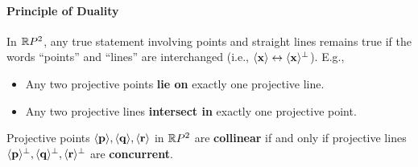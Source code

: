 \paragraph{Principle of Duality}
In \(\mathbb{R} P^2\), any true statement involving points and straight lines remains true if the words ``points'' and ``lines'' are interchanged (i.e., \(\langle \mathbf{x} \rangle \leftrightarrow \langle \mathbf{x} \rangle^\perp\)). E.g.,
\begin{itemize}
    \item Any two projective points \textbf{lie on} exactly one projective line.
    \item Any two projective lines \textbf{intersect in} exactly one projective point.
\end{itemize}


\begin{lemma}
    Projective points \(\langle \mathbf{p} \rangle, \langle \mathbf{q} \rangle, \langle \mathbf{r} \rangle\) in \(\mathbb{R} P^2\) are \textbf{collinear} if and only if projective lines \(\langle \mathbf{p} \rangle^\perp, \langle \mathbf{q} \rangle^\perp, \langle \mathbf{r} \rangle^\perp\) are \textbf{concurrent}.
\end{lemma}

\pagebreak